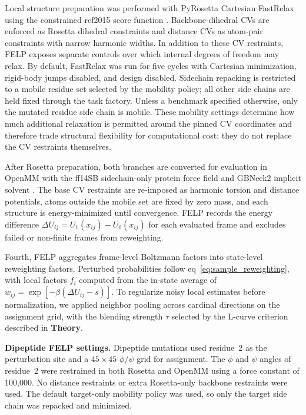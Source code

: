 \documentclass[journal=jctcce,manuscript=article,layout=twocolumn,hyperref=true]{achemso}
\newcommand{\eqnref}[1]{eq~\ref{#1}}
\begin{document}
	Local structure preparation was performed with PyRosetta \cite{chaudhury2010pyrosetta} Cartesian FastRelax using the constrained ref2015 score function \cite{alford2017ref2015}. Backbone-dihedral CVs are enforced as Rosetta dihedral constraints and distance CVs as atom-pair constraints with narrow harmonic widths. In addition to these CV restraints, FELP exposes separate controls over which internal degrees of freedom may relax. By default, FastRelax was run for five cycles with Cartesian minimization, rigid-body jumps disabled, and design disabled. Sidechain repacking is restricted to a mobile residue set selected by the mobility policy; all other side chains are held fixed through the task factory. Unless a benchmark specified otherwise, only the mutated residue side chain is mobile. These mobility settings determine how much additional relaxation is permitted around the pinned CV coordinates and therefore trade structural flexibility for computational cost; they do not replace the CV restraints themselves.
	
	After Rosetta preparation, both branches are converted for evaluation in OpenMM \cite{eastman2017openmm} with the ff14SB sidechain-only protein force field \cite{maier2015ff14sb} and GBNeck2 implicit solvent \cite{nguyen2013gbneck2}. The base CV restraints are re-imposed as harmonic torsion and distance potentials, atoms outside the mobile set are fixed by zero mass, and each structure is energy-minimized until convergence. FELP records the energy difference $\Delta U_{ij}=U_1(x_{ij})-U_0(x_{ij})$ for each evaluated frame and excludes failed or non-finite frames from reweighting.
	
	Fourth, FELP aggregates frame-level Boltzmann factors into state-level reweighting factors. Perturbed probabilities follow \eqnref{eq:sample_reweighting}, with local factors $f_i$ computed from the in-state average of $w_{ij}=\exp[-\beta(\Delta U_{ij}-s)]$. To regularize noisy local estimates before normalization, we applied neighbor pooling across cardinal directions on the assignment grid, with the blending strength $\tau$ selected by the L-curve criterion described in \textbf{Theory}.

	\textbf{Dipeptide FELP settings.} Dipeptide mutations used residue~2 as the perturbation site and a $45\times45$ $\phi/\psi$ grid for assignment. The $\phi$ and $\psi$ angles of residue~2 were restrained in both Rosetta and OpenMM using a force constant of 100,000. No distance restraints or extra Rosetta-only backbone restraints were used. The default target-only mobility policy was used, so only the target side chain was repacked and minimized.
\end{document}
